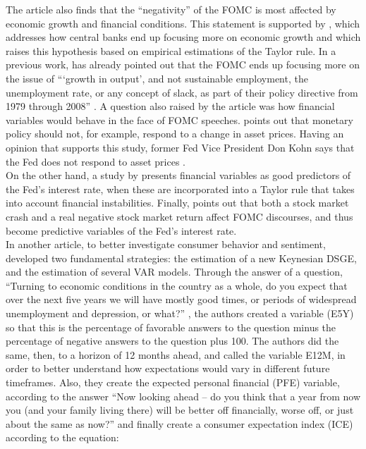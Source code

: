 The article also finds that the ``negativity'' of the FOMC is most affected by economic growth and financial conditions. This statement is supported by \cite{walsh2003speed}, which addresses how central banks end up focusing more on economic growth and \cite{coibion2011monetary} which raises this hypothesis based on empirical estimations of the Taylor rule. In a previous work, \cite{thornton2011does} has already pointed out that the FOMC ends up focusing more on the issue of ```growth in output', and not sustainable employment, the unemployment rate, or any concept of slack, as part of their policy directive from 1979 through 2008'' \cite[p.34]{shapiro2021taking}. A question also raised by the article was how financial variables would behave in the face of FOMC speeches. \cite{bernanke2001should} points out that monetary policy should not, for example, respond to a change in asset prices. Having an opinion that supports this study, former Fed Vice President Don Kohn says that the Fed does not respond to asset prices \cite{kohn2006monetary, kohn2009monetary}.\\

On the other hand, a study by \cite{peek2015should} presents financial variables as good predictors of the Fed's interest rate, when these are incorporated into a Taylor rule that takes into account financial instabilities. Finally, \cite{cieslak2021economics} points out that both a stock market crash and a real negative stock market return affect FOMC discourses, and thus become predictive variables of the Fed's interest rate.\\

In another article, to better investigate consumer behavior and sentiment, \cite{barsky2012information} developed two fundamental strategies: the estimation of a new Keynesian DSGE, and the estimation of several VAR models. Through the answer of a question, ``Turning to economic conditions in the country as a whole, do you expect that over the next five years we will have mostly good times, or periods of widespread unemployment and depression, or what?'' \cite[p.1347]{barsky2012information}, the authors created a variable (E5Y) so that this is the percentage of favorable answers to the question minus the percentage of negative answers to the question plus 100. The authors did the same, then, to a horizon of 12 months ahead, and called the variable E12M, in order to better understand how expectations would vary in different future timeframes. Also, they create the expected personal financial (PFE) variable, according to the answer ``Now looking ahead -- do you think that a year from now you (and your family living there) will be better off financially, worse off, or just about the same as now?'' \cite[p.1371]{barsky2012information} and finally create a consumer expectation index (ICE) according to the equation:

